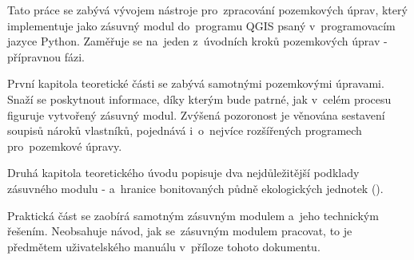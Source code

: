 Tato práce se zabývá vývojem nástroje pro~zpracování pozemkových úprav, který implementuje jako zásuvný modul do~programu QGIS psaný v~programovacím jazyce Python. Zaměřuje se na~jeden z~úvodních kroků pozemkových úprav - přípravnou fázi.

První kapitola teoretické části se zabývá samotnými pozemkovými úpravami. Snaží se poskytnout informace, díky kterým bude patrné, jak v~celém procesu figuruje vytvořený zásuvný modul. Zvýšená pozoronost je věnována sestavení soupisů nároků vlastníků, pojednává i~o~nejvíce rozšířených programech pro~pozemkové úpravy.

Druhá kapitola teoretického úvodu popisuje dva nejdůležitější podklady zásuvného modulu -  a~hranice bonitovaných půdně ekologických jednotek ().

Praktická část se zaobírá samotným zásuvným modulem a~jeho technickým řešením. Neobsahuje návod, jak se~zásuvným modulem pracovat, to je předmětem uživatelského manuálu v~příloze tohoto dokumentu.

